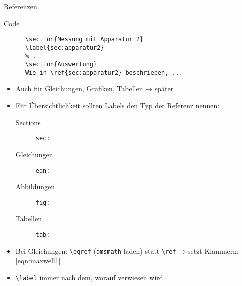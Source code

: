 \begin{frame}[fragile]{Referenzen}
  \begin{tblock}{Code}
    \begin{lstlisting}
      \section{Messung mit Apparatur 2}
      \label{sec:apparatur2}
      % .
      \section{Auswertung}
      Wie in \ref{sec:apparatur2} beschrieben, ...
    \end{lstlisting}
  \end{tblock}
  \begin{itemize}
    \item Auch für Gleichungen, Grafiken, Tabellen → später
    \item Für Übersichtlichkeit sollten Labels den Typ der Referenz nennen:
      \begin{description}
        \item[Sections]    \texttt{sec:}
        \item[Gleichungen] \texttt{eqn:}
        \item[Abbildungen] \texttt{fig:}
        \item[Tabellen]    \texttt{tab:}
      \end{description}
    \item Bei Gleichungen: \lstinline+\eqref+ (\texttt{amsmath} laden) statt \lstinline+\ref+ → setzt Klammern: \eqref{eqn:maxwell1}
    \item \lstinline+\label+ immer nach dem, worauf verwiesen wird
  \end{itemize}
\end{frame}
